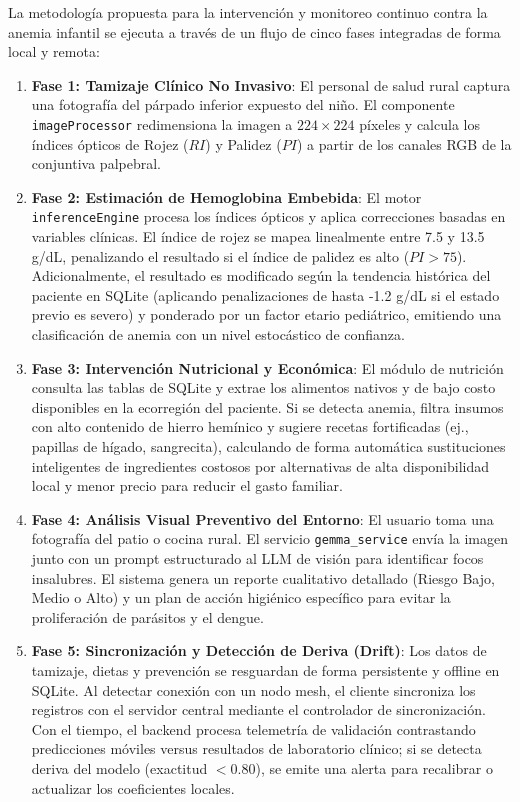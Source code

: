 La metodología propuesta para la intervención y monitoreo continuo contra la anemia infantil se ejecuta a través de un flujo de cinco fases integradas de forma local y remota:
\begin{enumerate}
    \item \textbf{Fase 1: Tamizaje Clínico No Invasivo}: El personal de salud rural captura una fotografía del párpado inferior expuesto del niño. El componente \texttt{imageProcessor} redimensiona la imagen a $224 \times 224$ píxeles y calcula los índices ópticos de Rojez ($RI$) y Palidez ($PI$) a partir de los canales RGB de la conjuntiva palpebral.
    \item \textbf{Fase 2: Estimación de Hemoglobina Embebida}: El motor \texttt{inferenceEngine} procesa los índices ópticos y aplica correcciones basadas en variables clínicas. El índice de rojez se mapea linealmente entre 7.5 y 13.5 g/dL, penalizando el resultado si el índice de palidez es alto ($PI > 75$). Adicionalmente, el resultado es modificado según la tendencia histórica del paciente en SQLite (aplicando penalizaciones de hasta -1.2 g/dL si el estado previo es severo) y ponderado por un factor etario pediátrico, emitiendo una clasificación de anemia con un nivel estocástico de confianza.
    \item \textbf{Fase 3: Intervención Nutricional y Económica}: El módulo de nutrición consulta las tablas de SQLite y extrae los alimentos nativos y de bajo costo disponibles en la ecorregión del paciente. Si se detecta anemia, filtra insumos con alto contenido de hierro hemínico y sugiere recetas fortificadas (ej., papillas de hígado, sangrecita), calculando de forma automática sustituciones inteligentes de ingredientes costosos por alternativas de alta disponibilidad local y menor precio para reducir el gasto familiar.
    \item \textbf{Fase 4: Análisis Visual Preventivo del Entorno}: El usuario toma una fotografía del patio o cocina rural. El servicio \texttt{gemma\_service} envía la imagen junto con un prompt estructurado al LLM de visión para identificar focos insalubres. El sistema genera un reporte cualitativo detallado (Riesgo Bajo, Medio o Alto) y un plan de acción higiénico específico para evitar la proliferación de parásitos y el dengue.
    \item \textbf{Fase 5: Sincronización y Detección de Deriva (Drift)}: Los datos de tamizaje, dietas y prevención se resguardan de forma persistente y offline en SQLite. Al detectar conexión con un nodo mesh, el cliente sincroniza los registros con el servidor central mediante el controlador de sincronización. Con el tiempo, el backend procesa telemetría de validación contrastando predicciones móviles versus resultados de laboratorio clínico; si se detecta deriva del modelo (exactitud $< 0.80$), se emite una alerta para recalibrar o actualizar los coeficientes locales.
\end{enumerate}
